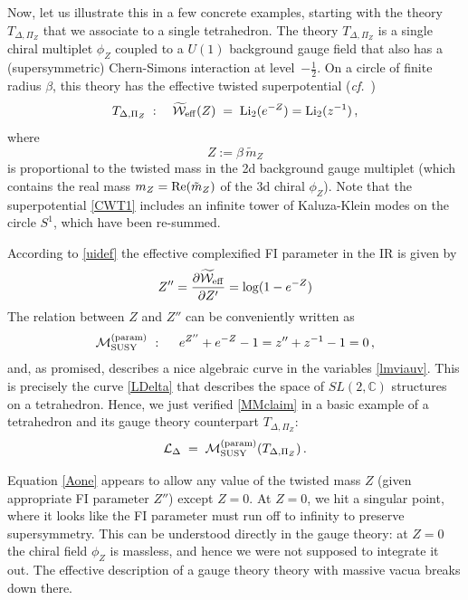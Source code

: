 \documentclass[hyper,letterpaper]{JHEP3}
\numberwithin{equation}{section}
\newcommand{\be}{\begin{equation}}
\newcommand{\ee}{\end{equation}}
\newcommand{\cf}{\emph{cf.}}
\newcommand{\C}{{\mathbb C}}
\newcommand{\Li}{{\rm Li}}
\renewcommand{\Re}{{\rm Re}}
\newcommand{\CL}{\mathcal{L}}
\newcommand{\CM}{\mathcal{M}}
\newcommand{\CW}{\mathcal{W}}
\begin{document}
Now, let us illustrate this in a few concrete examples, starting with the theory $T_{\Delta,\Pi_Z}$ that we associate
to a single tetrahedron. The theory $T_{\Delta,\Pi_Z}$ is a single chiral multiplet $\phi_Z$ coupled to a $U(1)$ background gauge field
that also has a (supersymmetric) Chern-Simons interaction at level~$-\tfrac{1}{2}$.
On a circle of finite radius $\beta$, this theory has the effective twisted superpotential (\cf\ \cite{Nek-5d, LN, NS-I, DG-Sdual})
%
\begin{equation}
T_{\Delta,\Pi_Z}\;:\quad \widetilde{\CW}_{{\rm eff}} (Z) \; = \; \Li_2(e^{-Z}) = \Li_2(z^{-1})\,, \label{CWT1}
\end{equation}
%
where
%
\be Z := \beta\,\tilde m_Z \ee
%
is proportional to the twisted mass in the 2d background gauge multiplet (which contains the real mass $m_Z=\Re(\tilde m_Z)$ of the 3d chiral $\phi_Z$). Note that the superpotential \eqref{CWT1} includes an infinite tower of Kaluza-Klein modes on the circle $S^1$, which have been re-summed.



According to \eqref{uidef} the effective complexified FI parameter in the IR is given by
\begin{equation}
Z'' = \frac{\partial \widetilde{\CW}_{{\rm eff}}}{\partial Z'} = \log(1-e^{-Z})
\end{equation}
The relation between $Z$ and $Z''$ can be conveniently written as
%
\begin{equation} \label{Aone}
\CM_{\rm SUSY}^{\rm (param)} ~:~\quad
e^{Z''} + e^{-Z} -1=z''+z^{-1}-1=0\,,
\end{equation}
%
and, as promised, describes a nice algebraic curve in the variables \eqref{lmviauv}.
This is precisely the curve \eqref{LDelta} that describes the space of $SL(2,\C)$ structures on a tetrahedron.
Hence, we just verified \eqref{MMclaim} in a basic example of a tetrahedron and its gauge theory counterpart $T_{\Delta,\Pi_Z}$:
%
\be
\CL_{\Delta} \; = \; \CM_{{\rm SUSY}}^{\rm (param)} (T_{\Delta,\Pi_Z})\,.
\ee



Equation \eqref{Aone} appears to allow any value of the twisted mass $Z$ (given appropriate FI parameter $Z''$) except $Z=0$. At $Z=0$, we hit a singular point, where it looks like the FI parameter must run off to infinity to preserve supersymmetry. 
This can be understood directly in the gauge theory: at $Z=0$ the chiral field $\phi_Z$ is massless, and hence we were not supposed to integrate it out. The effective description of a gauge theory theory with massive vacua breaks down there. 
\end{document}
